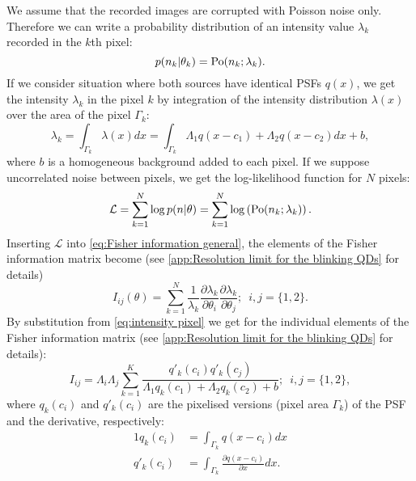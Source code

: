 We assume that the recorded images are corrupted with Poisson noise only. Therefore we can write a probability distribution of an intensity value $\lambda_k$ recorded in the $k$th pixel:
%
\begin{equation*}
	p(n_k|\theta_k)=\mathrm{Po}(n_k;\lambda_k).
\end{equation*}
%
If we consider situation where both sources have identical PSFs $q(x)$, we get the intensity $\lambda_k$ in the pixel $k$ by integration of the intensity distribution $\lambda(x)$ over the area of the pixel $\Gamma_k$:
%
\begin{equation}
	\lambda_k=\int_{\Gamma_k}\lambda(x)dx=\int_{\Gamma_k}\Lambda_1q(x-c_1)+\Lambda_2q(x-c_2)dx+b,
	\label{eq:intensity pixel}
\end{equation}
%
where $b$ is a homogeneous background added to each pixel. If we suppose uncorrelated noise between pixels, we get the log-likelihood function for $N$ pixels: 
%
\begin{equation}
	\mathcal{L}=\sum_{k=1}^N\log p(n|\theta)=\sum_{k=1}^N\log\left(\mathrm{Po}(n_k;\lambda_k)\right).
	\label{eq:FREM likekihood Poisson}
\end{equation}
%
Inserting $\mathcal{L}$ into \autoref{eq:Fisher information general}, the elements of the Fisher information matrix become (see \autoref{app:Resolution limit for the blinking QDs} for details)
%
\begin{equation}
	I_{ij}(\theta)=\sum_{k=1}^N\frac{1}{\lambda_k}\frac{\partial\lambda_k}{\partial\theta_i}\frac{\partial\lambda_k}{\partial\theta_j};\; \ i,j=\{1,2\}.
	\label{eq:FI - entries}
\end{equation}
%
By substitution from \autoref{eq:intensity pixel} we get for the individual elements of the Fisher information matrix (see \autoref{app:Resolution limit for the blinking QDs} for details): 
%
\begin{equation}
	I_{ij} =\Lambda_i\Lambda_j\sum_{k=1}^{K}\frac{q'_k(c_i)q'_k(c_j)}{\Lambda_1q_k(c_1)+\Lambda_2q_k(c_2)+b};\; \ i,j=\{1,2\},
	\label{eq:FI - individual}
\end{equation}
%
where $q_k(c_i)$ and $q'_k(c_i)$ are the pixelised versions (pixel area $\Gamma_k$) of the PSF and the derivative, respectively:
%
\begin{alignat*}{1}
	q_k(c_i) & =\int_{\Gamma_k}q(x-c_i)dx\\
	q'_k(c_i) & =\int_{\Gamma_k}\frac{\partial q(x-c_i)}{\partial x}dx.
\end{alignat*}
%

